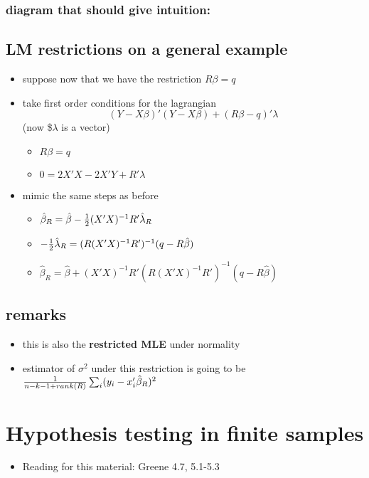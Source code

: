 \documentclass[11pt]{article}
\begin{document}
\subsubsection{diagram that should give intuition:}
\subsection{LM restrictions on a general example}
\label{sec-1-3}

\begin{itemize}
\item suppose now that we have the restriction $R\beta = q$
\item take first order conditions for the lagrangian
      \[ (Y - X\beta)'(Y - X\beta) + (R\beta - q)'\lambda \]
      (now \$$\lambda$ is a vector)
\begin{itemize}
\item $R\beta = q$
\item $0 = 2 X'X - 2 X'Y + R' \lambda$
\end{itemize}
\item mimic the same steps as before
\begin{itemize}
\item $\hat\beta_R = \hat\beta - {1\over2} (X'X)^{-1} R'\hat\lambda_R$
\item $-{1\over2} \hat\lambda_R = (R(X'X)^{-1}R')^{-1}(q - R\hat\beta)$
\item $\hat\beta_R = \hat\beta + (X'X)^{-1} R'(R(X'X)^{-1}R')^{-1}
        (q - R\hat\beta)$
\end{itemize}
\end{itemize}
\subsection{remarks}
\label{sec-1-4}

\begin{itemize}
\item this is also the \textbf{restricted MLE} under normality
\item estimator of $\sigma^2$ under this restriction is going to be ${1
      \over n - k - 1 + rank(R)} \sum_i (y_i - x_i'\hat\beta_R)^2$
\end{itemize}
\section{Hypothesis testing in finite samples}
\label{sec-2}

\begin{itemize}
\item Reading for this material: Greene 4.7, 5.1-5.3
\end{itemize}
\end{document}
